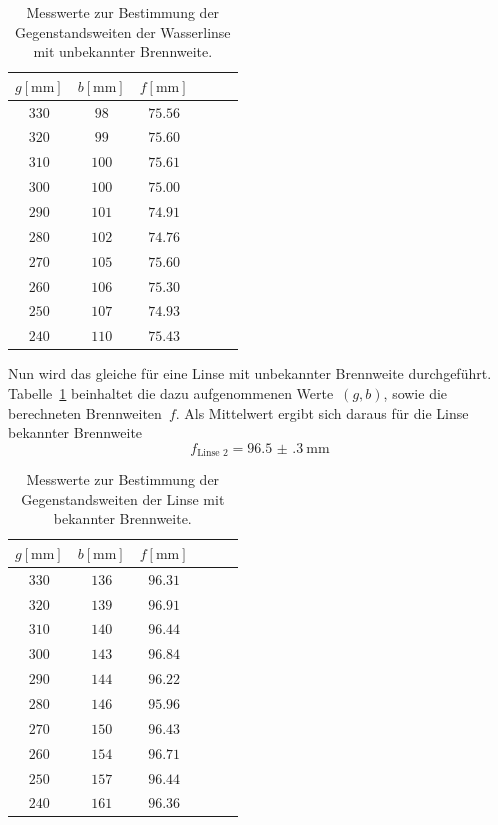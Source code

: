 \documentclass[
  parskip=half,
  bibliography=totoc,     %
  captions=tableheading,  %
  titlepage=firstiscover, %
]{scrartcl}
\begin{document}
\begin{table}[htp]
	\begin{center}
	\caption{Messwerte zur Bestimmung der Gegenstandsweiten der Wasserlinse mit unbekannter Brennweite.}
	\label{tab:b}
		\begin{tabular}{cccccc}
			\toprule
			{$g[\si{\milli\metre}]$} & {$b[\si{\milli\metre}]$} & {$f[\si{\milli\metre}]$}\\
			\midrule
			$330$ & $98$ & $75.56$ \\
			$320$ & $99$ & $75.60$ \\
			$310$ & $100$ & $75.61$ \\
			$300$ & $100$ & $75.00$ \\
			$290$ & $101$ & $74.91$ \\
			$280$ & $102$ & $74.76$\\
			$270$ & $105$ & $75.60$\\
			$260$ & $106$ & $75.30$\\
			$250$ & $107$ & $74.93$\\
			$240$ & $110$ & $75.43$\\
			\bottomrule
		\end{tabular}
	\end{center}
\end{table}
Nun wird das gleiche für eine Linse mit unbekannter Brennweite durchgeführt.
Tabelle~\ref{tab:b} beinhaltet die dazu aufgenommenen Werte~$(g,b)$, sowie
die berechneten Brennweiten~$f$. Als Mittelwert ergibt sich daraus für die Linse bekannter Brennweite
\begin{equation}
f_{\text{Linse 2}} = \SI{96.5(3)}{\milli\metre}
\end{equation}

\begin{table}[htp]
	\begin{center}
	\caption{Messwerte zur Bestimmung der Gegenstandsweiten der Linse mit bekannter Brennweite.}
	\label{tab:a}
		\begin{tabular}{cccccc}
			\toprule
			{$g[\si{\milli\metre}]$} & {$b[\si{\milli\metre}]$} &
      {$f[\si{\milli\metre}]$}\\
			\midrule
			$330$ & $136$ & $96.31$\\
			$320$ & $139$ & $96.91$\\
			$310$ & $140$ & $96.44$\\
			$300$ & $143$ & $96.84$\\
			$290$ & $144$ & $96.22$\\
			$280$ & $146$ & $95.96$\\
			$270$ & $150$ & $96.43$\\
			$260$ & $154$ & $96.71$\\
			$250$ & $157$ & $96.44$\\
			$240$ & $161$ & $96.36$\\
			\bottomrule
		\end{tabular}
	\end{center}
\end{table}
\end{document}
